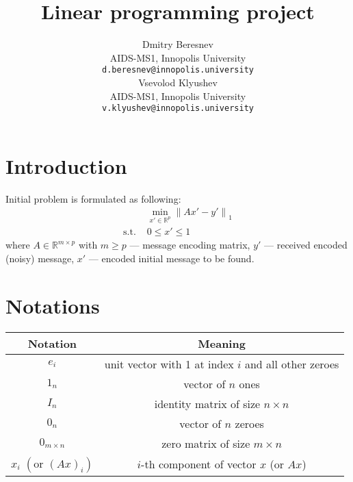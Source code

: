 \documentclass{article}
\title{Linear programming project}
\date{} 					%
\author{
  \hspace{1mm}Dmitry Beresnev \\
	AIDS-MS1, Innopolis University\\
	\texttt{d.beresnev@innopolis.university} \\
	\And{}
  \hspace{1mm}Vsevolod Klyushev \\
	AIDS-MS1, Innopolis University\\
	\texttt{v.klyushev@innopolis.university}
}
\def\R{\mathbb{R}}
\begin{document}
\maketitle


\section{Introduction}
Initial problem is formulated as following:
\begin{equation}\label{eq:init}
  \begin{aligned}
                 & \min\limits_{x' \in \R^p} {\| Ax'-y' \|}_1 \\
    \text{s.t. } & 0 \leq x' \leq 1
  \end{aligned}
\end{equation}
where $A \in \R^{m \times p}$ with $m \geq p$ --- message  encoding matrix,
$y'$ --- received encoded (noisy) message,
$x'$ --- encoded initial message to be found.

\section{Notations}

 {
  \renewcommand{\arraystretch}{1.5}
  \renewcommand{\tabcolsep}{10pt}
  \begin{table}[hbthbt]
    \centering
    \begin{tabular}{cc}
      \toprule
      \textbf{Notation}                          & \textbf{Meaning}                                     \\
      \midrule
      $e_i$                                      & unit vector with 1 at index $i$ and all other zeroes \\
      $1_n$                                      & vector of $n$ ones                                   \\
      $I_n$                                      & identity matrix of size $n \times n$                 \\
      $0_n$                                      & vector of $n$ zeroes                                 \\
      $0_{m \times n}$                           & zero matrix of size $m \times n$                     \\
      $x_i$ $\left( \text{or } {(Ax)}_i \right)$ & $i$-th component of vector $x$    (or $Ax$)          \\

      \bottomrule
    \end{tabular}
  \end{table}
 }
\end{document}
